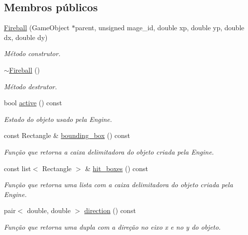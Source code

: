 \subsection*{Membros públicos}
\begin{DoxyCompactItemize}
\item 
\mbox{\hyperlink{classFireball_a4035f700f882afc6e0760b4195e90ffc}{Fireball}} (Game\+Object $\ast$parent, unsigned mage\+\_\+id, double xp, double yp, double dx, double dy)
\begin{DoxyCompactList}\small\item\em Método construtor. \end{DoxyCompactList}\item 
\mbox{\label{classFireball_a60938554b4140792132d3cd993d78eef}} 
\mbox{\hyperlink{classFireball_a60938554b4140792132d3cd993d78eef}{$\sim$\+Fireball}} ()
\begin{DoxyCompactList}\small\item\em Método destrutor. \end{DoxyCompactList}\item 
bool \mbox{\hyperlink{classFireball_a4c669319c3cfa500f352c758f1156801}{active}} () const
\begin{DoxyCompactList}\small\item\em Estado do objeto usado pela Engine. \end{DoxyCompactList}\item 
const Rectangle \& \mbox{\hyperlink{classFireball_a3c91f2eceddb1d7f317cc6961976ac68}{bounding\+\_\+box}} () const
\begin{DoxyCompactList}\small\item\em Função que retorna a caixa delimitadora do objeto criada pela Engine. \end{DoxyCompactList}\item 
const list$<$ Rectangle $>$ \& \mbox{\hyperlink{classFireball_af65513f81a16dc83b3afb6b672ffacdc}{hit\+\_\+boxes}} () const
\begin{DoxyCompactList}\small\item\em Função que retorna uma lista com a caixa delimitadora do objeto criada pela Engine. \end{DoxyCompactList}\item 
pair$<$ double, double $>$ \mbox{\hyperlink{classFireball_a312843f3db953d32b52d337bdc07cc1d}{direction}} () const
\begin{DoxyCompactList}\small\item\em Função que retorna uma dupla com a direção no eixo x e no y do objeto. \end{DoxyCompactList}\end{DoxyCompactItemize}
